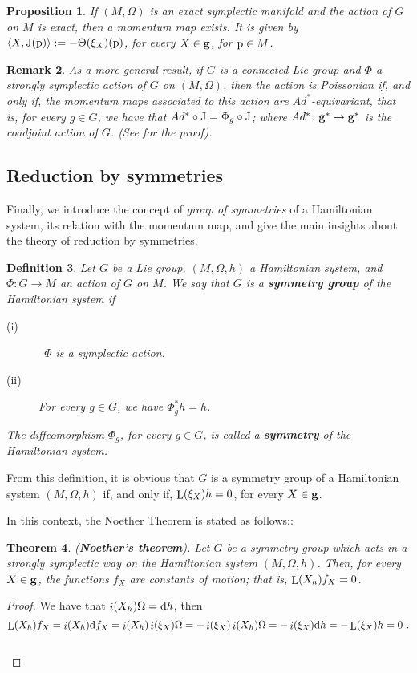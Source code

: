 \documentclass[12pt]{report}
\newtheorem{teor}{Theorem}[chapter]
\newtheorem{prop}[teor]{Proposition}
\newtheorem{definition}[teor]{Definition}
\newtheorem{remark}[teor]{Remark}
\def\qed{\ifvmode\removelastskip\fi
{\unskip\nobreak\hfil\penalty50\hbox{}\nobreak\hfil
\hbox{\vrule height1.2ex width1.2ex}\parfillskip=0pt
\finalhyphendemerits=0 \par\smallskip}}
\def\d{{\rm d}}
\def\Lie{\mathop{\rm L}\nolimits}
\def\inn{\mathop{i}\nolimits}
\begin{document}
\begin{prop}
If $(M,\Omega )$ is an exact symplectic manifold
and the action of $G$ on $M$ is exact,
then a momentum map exists. It is given by
$\langle X,{\rm J}({\rm p})\rangle:= -\Theta (\xi_X)({\rm p})$,
for every $X \in {\bf g}$, for ${\rm p}\in M$.
\end{prop}

\begin{remark}{\rm 
As a more general result,
if $G$ is a connected Lie group and $\Phi$ a strongly symplectic action
of $G$ on $(M,\Omega)$, then the action is Poissonian
if, and only if,
the momentum maps associated to this action 
are $Ad^*$-equivariant, that is,
for every $g \in G$, we have that $Ad^*\circ {\rm J}=\Phi_g\circ{\rm J}$;
where $Ad^*\colon{\bf g}^*\to{\bf g}^*$ is the {\sl coadjoint action} of $G$.
(See \cite{So-ssd} for the proof).
}\end{remark}


\subsection{Reduction by symmetries}
\label{cami3}


Finally, we introduce the concept of 
{\sl group of symmetries} of a Hamiltonian system,
its relation with the momentum map,
and give the main insights about the theory of reduction by symmetries.

\begin{definition}
Let $G$ be a Lie group, $(M,\Omega,h)$ a Hamiltonian system, 
and $\Phi \colon G \to M$ an action of $G$ on $M$.
We say that $G$ is a \textbf{symmetry group} of the Hamiltonian system if
\begin{description}
\item[{\rm (i)}] \ 
$\Phi$ is a symplectic action.
\item[{\rm (ii)}]
For every $g \in G$, we have $\Phi_g^*h = h$.
\end{description}
The diffeomorphism $\Phi_g$, for every $g \in G$, is called a
\textbf{symmetry} of the Hamiltonian system.
\end{definition}

From this definition, it is obvious that 
$G$ is a symmetry group of a Hamiltonian system $(M,\Omega,h)$
if, and only if,  $\Lie(\xi_X)h = 0$, for every $X \in {\bf g}$. 

In this context, the Noether Theorem is stated as follows::

\begin{teor}
({\sl \textbf{Noether's theorem}}).
Let $G$ be a symmetry group which acts in a strongly symplectic way
on the Hamiltonian system $(M,\Omega,h)$.
Then, for every $X \in {\bf g}$, the functions $f_X$
are constants of motion; that is, $\Lie(X_h)f_X = 0$.
\end{teor}
\begin{proof}
We have that $\inn(X_h)\Omega=\d h$, then
$$
\Lie(X_h)f_X=\inn(X_h)\d f_X 
= \inn(X_h)\inn(\xi_X)\Omega
=-\inn(\xi_X)\inn(X_h)\Omega = -\inn(\xi_X)\d h
=-\Lie(\xi_X)h = 0 \ .
$$
\\ \qed  \end{proof}
\end{document}
